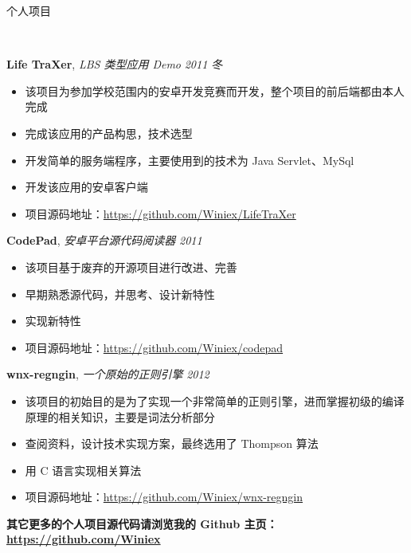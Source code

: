 \documentclass[9pt]{ctexart}
\newenvironment{changemargin}[2]{%
  \begin{list}{}{%
    \setlength{\topsep}{0pt}%
    \setlength{\leftmargin}{#1}%
    \setlength{\rightmargin}{#2}%
    \setlength{\listparindent}{\parindent}%
    \setlength{\itemindent}{\parindent}%
    \setlength{\parsep}{\parskip}%
  }%
  \item[]}{\end{list}
}
\newcommand{\lineover}{
	\begin{changemargin}{-0.05in}{-0.05in}
		\vspace*{-8pt}
		\hrulefill \\
		\vspace*{-2pt}
	\end{changemargin}
}
\newcommand{\header}[1]{
	\begin{changemargin}{-0.5in}{-0.5in}
		\scshape{#1}\\
  	\lineover
	\end{changemargin}
}
\newenvironment{body} {
	\vspace*{-16pt}
	\begin{changemargin}{-0.25in}{-0.5in}
  }	
	{\end{changemargin}
}
\begin{document}
\smallskip


\header{个人项目}

\begin{body}
	\vspace{14pt}
	\textbf{Life TraXer}, \emph{LBS 类型应用 Demo} \hfill \emph{2011 冬}\\
	\vspace*{-4pt}
	\begin{itemize} \itemsep -0pt  %
		\item 该项目为参加学校范围内的安卓开发竞赛而开发，整个项目的前后端都由本人完成
		\item 完成该应用的产品构思，技术选型
		\item 开发简单的服务端程序，主要使用到的技术为 Java Servlet、MySql
		\item 开发该应用的安卓客户端
		\item 项目源码地址：\url{https://github.com/Winiex/LifeTraXer}
	\end{itemize}

	\textbf {CodePad}, \emph{安卓平台源代码阅读器} \hfill \emph{2011}\\
	\vspace*{-4pt}
	\begin{itemize} \itemsep -0pt
		\item 该项目基于废弃的开源项目进行改进、完善
		\item 早期熟悉源代码，并思考、设计新特性
		\item 实现新特性
		\item 项目源码地址：\url{https://github.com/Winiex/codepad}
	\end{itemize}

	\newpage
	\vspace*{-4pt}
	\textbf {wnx-regngin}, \emph{一个原始的正则引擎} \hfill \emph{2012}\\
	\begin{itemize} \itemsep -0pt
		\item 该项目的初始目的是为了实现一个非常简单的正则引擎，进而掌握初级的编译原理的相关知识，主要是词法分析部分
		\item 查阅资料，设计技术实现方案，最终选用了 Thompson 算法
		\item 用 C 语言实现相关算法
		\item 项目源码地址：\url{https://github.com/Winiex/wnx-regngin}
	\end{itemize}

	\vspace*{-4pt}
	\textbf {其它更多的个人项目源代码请浏览我的 Github 主页：\url{https://github.com/Winiex}}
\end{body}
\end{document}
